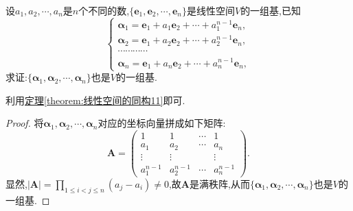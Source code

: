 \documentclass[../../main.tex]{subfiles}%
\begin{document}
\begin{example}\label{example:3.110.1}
设\(a_1,a_2,\cdots,a_n\)是\(n\)个不同的数,\(\{\boldsymbol{e}_1,\boldsymbol{e}_2,\cdots,\boldsymbol{e}_n\}\)是线性空间\(V\)的一组基,已知
\[
\begin{cases}
\boldsymbol{\alpha}_1=\boldsymbol{e}_1 + a_1\boldsymbol{e}_2+\cdots + a_1^{n - 1}\boldsymbol{e}_n,\\
\boldsymbol{\alpha}_2=\boldsymbol{e}_1 + a_2\boldsymbol{e}_2+\cdots + a_2^{n - 1}\boldsymbol{e}_n,\\
\cdots\cdots\cdots\cdots\\
\boldsymbol{\alpha}_n=\boldsymbol{e}_1 + a_n\boldsymbol{e}_2+\cdots + a_n^{n - 1}\boldsymbol{e}_n,
\end{cases}
\]
求证:\(\{\boldsymbol{\alpha}_1,\boldsymbol{\alpha}_2,\cdots,\boldsymbol{\alpha}_n\}\)也是\(V\)的一组基.
\end{example}
\begin{note}
利用\hyperref[theorem:线性空间的同构11]{定理\ref{theorem:线性空间的同构11}}即可.
\end{note}
\begin{proof}

将\(\boldsymbol{\alpha}_1,\boldsymbol{\alpha}_2,\cdots,\boldsymbol{\alpha}_n\)对应的坐标向量拼成如下矩阵:
\[
\boldsymbol{A}=\begin{pmatrix}
1&1&\cdots&1\\
a_1&a_2&\cdots&a_n\\
\vdots&\vdots&&\vdots\\
a_1^{n - 1}&a_2^{n - 1}&\cdots&a_n^{n - 1}
\end{pmatrix}.
\]
显然,\(|\boldsymbol{A}|=\prod_{1\leqslant  i<j\leqslant  n}(a_j - a_i)\neq0\),故\(\boldsymbol{A}\)是满秩阵,从而\(\{\boldsymbol{\alpha}_1,\boldsymbol{\alpha}_2,\cdots,\boldsymbol{\alpha}_n\}\)也是\(V\)的一组基. 

\end{proof}
\end{document}
